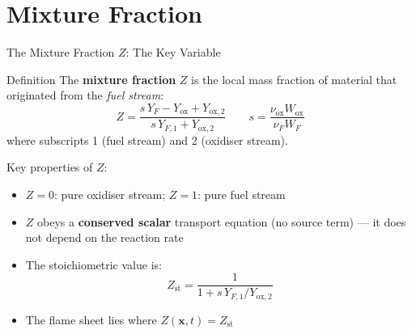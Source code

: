 \documentclass[12pt,aspectratio=169]{beamer}
\newcommand{\Zst}{Z_{\text{st}}}
\begin{document}
\section{Mixture Fraction}

\begin{frame}{The Mixture Fraction $Z$: The Key Variable}

  \begin{block}{Definition}
    The \textbf{mixture fraction} $Z$ is the local mass fraction of
    material that originated from the \emph{fuel stream}:
    \[
      Z = \frac{s\,Y_F - Y_{\text{ox}} + Y_{\text{ox},2}}
               {s\,Y_{F,1} + Y_{\text{ox},2}}
      \qquad
      s = \frac{\nu_{\text{ox}} W_{\text{ox}}}{\nu_F W_F}
    \]
    where subscripts 1 (fuel stream) and 2 (oxidiser stream).
  \end{block}

  \vspace{4pt}
  Key properties of $Z$:
  \begin{itemize}
    \item $Z = 0$: pure oxidiser stream; $Z = 1$: pure fuel stream
    \item $Z$ obeys a \textbf{conserved scalar} transport equation
          (no source term) --- it does not depend on the reaction rate
    \item The stoichiometric value is:
          \[
            \Zst = \frac{1}{1 + s\,Y_{F,1}/Y_{\text{ox},2}}
          \]
    \item The flame sheet lies where $Z(\mathbf{x},t) = \Zst$
  \end{itemize}
\end{frame}
\end{document}
